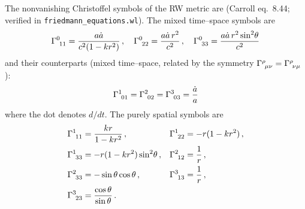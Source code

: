 The nonvanishing Christoffel symbols of the RW metric are
(Carroll eq.~8.44; verified in
\texttt{friedmann\_equations.wl}).  The mixed time--space symbols are
\begin{equation}
    \Gamma^{0}_{\ 1 1} = \frac{a\dot{a}}{c^2(1-kr^2)} \,,
    \quad
    \Gamma^{0}_{\ 2 2} = \frac{a\dot{a}\, r^2}{c^2} \,,
    \quad
    \Gamma^{0}_{\ 3 3} = \frac{a\dot{a}\, r^2 \sin^2\!\theta}{c^2}
    \label{eq:christoffel_0ij}
\end{equation}
and their counterparts (mixed time--space, related by the symmetry $\Gamma^{\rho}_{\ \mu \nu} = \Gamma^{\rho}_{\ \nu \mu}$):
\begin{equation}
    \Gamma^{1}_{\ 0 1} = \Gamma^{2}_{\ 0 2}
    = \Gamma^{3}_{\ 0 3} = \frac{\dot{a}}{a}
    \label{eq:christoffel_i0j}
\end{equation}
where the dot denotes $d/dt$.  The purely spatial symbols are
\begin{align}
    \Gamma^{1}_{\ 1 1} &= \frac{kr}{1-kr^2} \,, &
    \Gamma^{1}_{\ 2 2} &= -r(1-kr^2) \,, \nonumber \\
    \Gamma^{1}_{\ 3 3} &= -r(1-kr^2)\sin^2\!\theta \,, &
    \Gamma^{2}_{\ 1 2} &= \frac{1}{r} \,, \nonumber \\
    \Gamma^{2}_{\ 3 3} &= -\sin\theta\cos\theta \,, &
    \Gamma^{3}_{\ 1 3} &= \frac{1}{r} \,, \nonumber \\
    \Gamma^{3}_{\ 2 3} &= \frac{\cos\theta}{\sin\theta} \,.
    \label{eq:christoffel_spatial}
\end{align}


